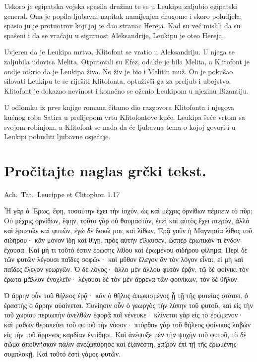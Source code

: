 Uskoro je egipatska vojska spasila družinu te se u Leukipu zaljubio egipatski general. Ona je popila ljubavni napitak namijenjen drugome i skoro poludjela; spasio ju je protuotrov koji joj je dao stranac Hereja. Kad su već mislili da su spašeni i da se vraćaju u sigurnost Aleksandrije, Leukipu je oteo Hereja.

Uvjeren da je Leukipa mrtva, Klitofont se vratio u Aleksandriju. U njega se zaljubila udovica Melita. Otputovali su Efez, odakle je bila Melita, a Klitofont je ondje otkrio da je Leukipa živa. No živ je bio i Melitin muž. On je pokušao silovati Leukipu te se riješiti Klitofonta, optuživši ga za preljub i ubojstvo. Klitofont je dokazao nevinost i konačno se oženio Leukipom u njezinu Bizantiju. 

U odlomku iz prve knjige romana čitamo dio razgovora Klitofonta i njegova kućnog roba Satira u prelijepom vrtu Klitofontove kuće. Leukipa šeće vrtom sa svojom robinjom, a Klitofont se nada da će ljubavna tema o kojoj govori i u Leukipi pobuditi ljubavne osjećaje.



\section*{Pročitajte naglas grčki tekst.}

Ach.~Tat.\ Leucippe et Clitophon 1.17


\medskip


{\large

\begin{greek}

\noindent Ἦ γὰρ ὁ Ἔρως, ἔφη, τοσαύτην ἔχει τὴν ἰσχύν, ὡς καὶ μέχρις ὀρνίθων πέμπειν τὸ πῦρ; Οὐ μέχρις ὀρνίθων, ἔφην, τοῦτο γὰρ οὐ θαυμαστόν, ἐπεὶ καὶ αὐτὸς ἔχει πτερόν, ἀλλὰ καὶ ἑρπετῶν καὶ φυτῶν, ἐγὼ δὲ δοκῶ μοι, καὶ λίθων. Ἐρᾷ γοῦν ἡ Μαγνησία λίθος τοῦ σιδήρου· κἂν μόνον ἴδῃ καὶ θίγῃ, πρὸς αὑτὴν εἵλκυσεν, ὥσπερ ἐρωτικόν τι ἔνδον ἔχουσα. Καὶ μή τι τοῦτό ἐστιν ἐρώσης λίθου καὶ ἐρωμένου σιδήρου φίλημα; Περὶ δὲ τῶν φυτῶν λέγουσι παῖδες σοφῶν· καὶ μῦθον ἔλεγον ἂν τὸν λόγον εἶναι, εἰ μὴ καὶ παῖδες ἔλεγον γεωργῶν. Ὁ δὲ λόγος· ἄλλο μὲν ἄλλου φυτὸν ἐρᾷν, τῷ δὲ φοίνικι τὸν ἔρωτα μᾶλλον ἐνοχλεῖν· λέγουσι δὲ τὸν μὲν ἄρρενα τῶν φοινίκων, τὸν δὲ θῆλυν.

\noindent Ὁ ἄρρην οὖν τοῦ θήλεος ἐρᾷ· κἂν ὁ θῆλυς ἀπῳκισμένος ᾖ τῇ τῆς φυτείας στάσει, ὁ ἐραστὴς ὁ ἄρρην αὐαίνεται. Συνίησιν οὖν ὁ γεωργὸς τὴν λύπην τοῦ φυτοῦ, καὶ εἰς τὴν τοῦ χωρίου περιωπὴν ἀνελθὼν ἐφορᾷ ποῖ νένευκε· κλίνεται γὰρ εἰς τὸ ἐρώμενον· καὶ μαθὼν θεραπεύει τοῦ φυτοῦ τὴν νόσον· πτόρθον γὰρ τοῦ θήλεος φοίνικος λαβὼν εἰς τὴν τοῦ ἄρρενος καρδίαν ἐντίθησι. Καὶ ἀνέψυξε μὲν τὴν ψυχὴν τοῦ φυτοῦ, τὸ δὲ σῶμα ἀποθνῆσκον πάλιν ἀνεζωπύρησε καὶ ἐξανέστη, χαῖρον ἐπὶ τῇ τῆς ἐρωμένης  συμπλοκῇ. Καὶ τοῦτό ἐστὶ γάμος φυτῶν.

\end{greek}

}


